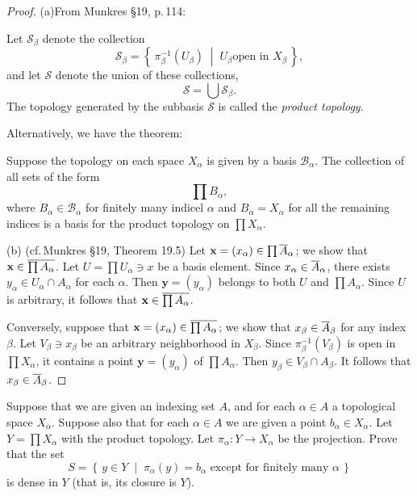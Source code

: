 \begin{proof}
(a)From Munkres \S19, p.\,114:
\begin{definition*}
Let $\mathcal{S}_\beta$ denote the collection
\[
\mathcal{S}_\beta=\left\{\,\pi_\beta^{-1}(U_\beta)\;\middle|\;\text{$U_\beta$
  open in $X_\beta$}\,\right\},
\]
and let $\mathcal{S}$ denote the union of these collections,
\[
\mathcal{S}=\bigcup\mathcal{S}_\beta.
\]
The topology generated by the subbasis $\mathcal{S}$ is called
the \emph{product topology}.
\end{definition*}
Alternatively, we have the theorem:
\begin{theorem*}
Suppose the topology on each space $X_\alpha$ is given by a basis
$\mathcal{B}_\alpha$. The collection of all sets of the form
\[
\prod B_\alpha,
\]
where $B_\alpha\in\mathcal{B}_\alpha$ for finitely many indicel
$\alpha$ and $B_\alpha=X_\alpha$ for all the remaining indices is
a basis for the product topology on $\prod X_\alpha$.
\end{theorem*}

(b) (cf.\,Munkres \S19, Theorem 19.5) Let
$\mathbf{x}=(x_\alpha)\in\prod\overline{A}_\alpha$; we show that
$\mathbf{x}\in\overline{\prod A_\alpha}$. Let $U=\prod U_\alpha\ni x$ be a
basis element. Since $x_\alpha\in\overline{A}_\alpha$, there exists
$y_\alpha\in U_\alpha\cap A_\alpha$ for each $\alpha$. Then
$\mathbf{y}=(y_\alpha)$ belongs to both $U$ and $\prod
A_\alpha$. Since $U$ is arbitrary, it follows that
$\mathbf{x}\in\overline{\prod A_\alpha}$.

Conversely, suppose that $\mathbf{x}=(x_\alpha)\in\overline{\prod
  A_\alpha}$; we show that $x_\beta\in\overline{A}_\beta$ for any
index $\beta$. Let $V_\beta\ni x_\beta$ be an arbitrary
neighborhood in $X_\beta$. Since $\pi_\beta^{-1}(V_\beta)$ is
open in $\prod X_\alpha$, it contains a point
$\mathbf{y}=(y_\alpha)$ of $\prod A_\alpha$. Then $y_\beta\in
V_\beta\cap A_\beta$. It follows that $x_\beta\in\overline{A}_\beta$.
\end{proof}
\begin{problem}
Suppose that we are given an indexing set $A$, and for each
$\alpha\in A$ a topological space $X_\alpha$. Suppose also that
for each $\alpha\in A$ we are given a point $b_\alpha\in
X_\alpha$. Let $Y=\prod X_\alpha$ with the product topology. Let
$\pi_\alpha\colon Y\to X_\alpha$ be the projection. Prove that
the set
\[
S=\left\{\,y\in Y\;\middle|\;\text{$\pi_\alpha(y)=b_\alpha$ except for
    finitely many $\alpha$}\,\right\}
\]
is dense in $Y$ (that is, its closure is $Y$).
\end{problem}
